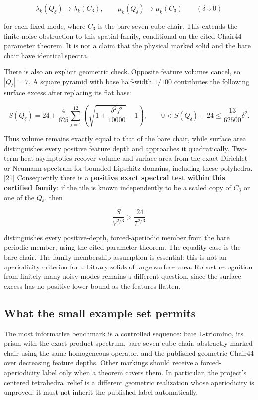 \documentclass[11pt]{article}
\begin{document}
\[ \lambda_k(Q_\delta)\longrightarrow\lambda_k(C_3),\qquad
\mu_k(Q_\delta)\longrightarrow\mu_k(C_3)\qquad(\delta\downarrow0) \]

for each fixed mode, where \(C_3\) is the bare seven-cube chair. This extends the finite-noise obstruction to this spatial family, conditional on the cited Chair44 parameter theorem. It is not a claim that the physical marked solid and the bare chair have identical spectra.



There is also an explicit geometric check. Opposite feature volumes cancel, so \(|Q_\delta|=7\). A square pyramid with base half-width \(1/100\) contributes the following surface excess after replacing its flat base:


\[ S(Q_\delta)=24+\frac{4}{625}\sum_{j=1}^{12}
\left(\sqrt{1+\frac{\delta^2j^2}{10000}}-1\right),\qquad
0<S(Q_\delta)-24\le\frac{13}{62500}\delta^2. \]

Thus volume remains exactly equal to that of the bare chair, while surface area distinguishes every positive feature depth and approaches it quadratically. Two-term heat asymptotics recover volume and surface area from the exact Dirichlet or Neumann spectrum for bounded Lipschitz domains, including these polyhedra. \hyperlink{ref21}{[21]} Consequently there is a \textbf{positive exact spectral test within this certified family}: if the tile is known independently to be a scaled copy of \(C_3\) or one of the \(Q_\delta\), then


\[ \frac{S}{V^{2/3}}>\frac{24}{7^{2/3}} \]

distinguishes every positive-depth, forced-aperiodic member from the bare periodic member, using the cited parameter theorem. The equality case is the bare chair. The family-membership assumption is essential: this is not an aperiodicity criterion for arbitrary solids of large surface area. Robust recognition from finitely many noisy modes remains a different question, since the surface excess has no positive lower bound as the features flatten.



\subsection*{What the small example set permits}


The most informative benchmark is a controlled sequence: bare L-triomino, its prism with the exact product spectrum, bare seven-cube chair, abstractly marked chair using the same homogeneous operator, and the published geometric Chair44 over decreasing feature depths. Other markings should receive a forced-aperiodicity label only when a theorem covers them. In particular, the project's centered tetrahedral relief is a different geometric realization whose aperiodicity is unproved; it must not inherit the published label automatically.
\end{document}
